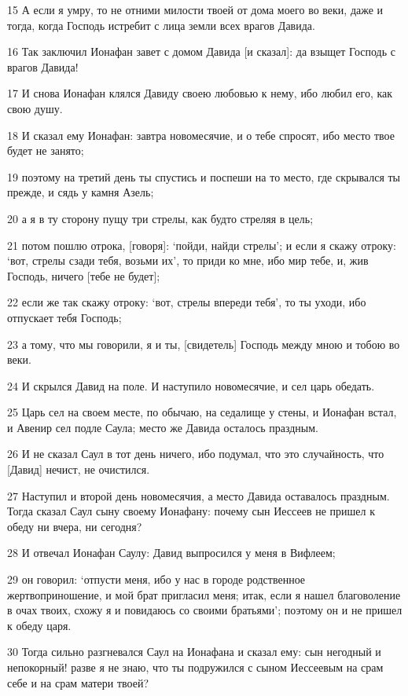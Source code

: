 \par 15 А если я умру, то не отними милости твоей от дома моего во веки, даже и тогда, когда Господь истребит с лица земли всех врагов Давида.
\par 16 Так заключил Ионафан завет с домом Давида [и сказал]: да взыщет Господь с врагов Давида!
\par 17 И снова Ионафан клялся Давиду своею любовью к нему, ибо любил его, как свою душу.
\par 18 И сказал ему Ионафан: завтра новомесячие, и о тебе спросят, ибо место твое будет не занято;
\par 19 поэтому на третий день ты спустись и поспеши на то место, где скрывался ты прежде, и сядь у камня Азель;
\par 20 а я в ту сторону пущу три стрелы, как будто стреляя в цель;
\par 21 потом пошлю отрока, [говоря]: `пойди, найди стрелы'; и если я скажу отроку: `вот, стрелы сзади тебя, возьми их', то приди ко мне, ибо мир тебе, и, жив Господь, ничего [тебе не будет];
\par 22 если же так скажу отроку: `вот, стрелы впереди тебя', то ты уходи, ибо отпускает тебя Господь;
\par 23 а тому, что мы говорили, я и ты, [свидетель] Господь между мною и тобою во веки.
\par 24 И скрылся Давид на поле. И наступило новомесячие, и сел царь обедать.
\par 25 Царь сел на своем месте, по обычаю, на седалище у стены, и Ионафан встал, и Авенир сел подле Саула; место же Давида осталось праздным.
\par 26 И не сказал Саул в тот день ничего, ибо подумал, что это случайность, что [Давид] нечист, не очистился.
\par 27 Наступил и второй день новомесячия, а место Давида оставалось праздным. Тогда сказал Саул сыну своему Ионафану: почему сын Иессеев не пришел к обеду ни вчера, ни сегодня?
\par 28 И отвечал Ионафан Саулу: Давид выпросился у меня в Вифлеем;
\par 29 он говорил: `отпусти меня, ибо у нас в городе родственное жертвоприношение, и мой брат пригласил меня; итак, если я нашел благоволение в очах твоих, схожу я и повидаюсь со своими братьями'; поэтому он и не пришел к обеду царя.
\par 30 Тогда сильно разгневался Саул на Ионафана и сказал ему: сын негодный и непокорный! разве я не знаю, что ты подружился с сыном Иессеевым на срам себе и на срам матери твоей?
